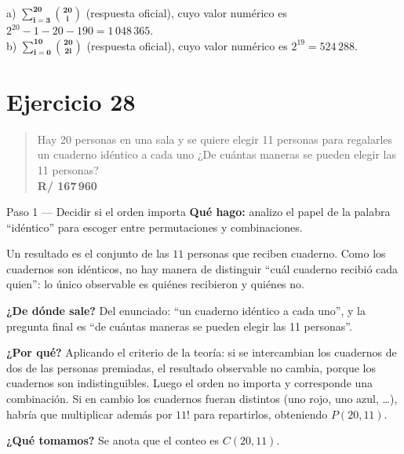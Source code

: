 \documentclass[11pt]{article}
\begin{document}
\begin{resp}
a) $\displaystyle\mathbf{\sum_{i=3}^{20}\binom{20}{i}}$ (respuesta oficial), cuyo valor numérico es $2^{20}-1-20-190=1\,048\,365$.\\[4pt]
b) $\displaystyle\mathbf{\sum_{i=0}^{10}\binom{20}{2i}}$ (respuesta oficial), cuyo valor numérico es $2^{19}=524\,288$.
\end{resp}

\section*{Ejercicio 28}

\begin{quote}
Hay 20 personas en una sala y se quiere elegir 11 personas para regalarles un cuaderno idéntico a cada uno ¿De cuántas maneras se pueden elegir las 11 personas?\\[2pt]
\textbf{R/ 167\,960}
\end{quote}

\begin{paso}{Paso 1 --- Decidir si el orden importa}
\textbf{Qué hago:} analizo el papel de la palabra ``idéntico'' para escoger entre permutaciones y combinaciones.

Un resultado es el conjunto de las $11$ personas que reciben cuaderno. Como los cuadernos son idénticos, no hay manera de distinguir ``cuál cuaderno recibió cada quien'': lo único observable es quiénes recibieron y quiénes no.

\textbf{¿De dónde sale?} Del enunciado: ``un cuaderno idéntico a cada uno'', y la pregunta final es ``de cuántas maneras se pueden elegir las 11 personas''.

\textbf{¿Por qué?} Aplicando el criterio de la teoría: si se intercambian los cuadernos de dos de las personas premiadas, el resultado observable no cambia, porque los cuadernos son indistinguibles. Luego el orden no importa y corresponde una combinación. Si en cambio los cuadernos fueran distintos (uno rojo, uno azul, \dots), habría que multiplicar además por $11!$ para repartirlos, obteniendo $P(20,11)$.

\textbf{¿Qué tomamos?} Se anota que el conteo es $C(20,11)$.
\end{paso}
\end{document}
